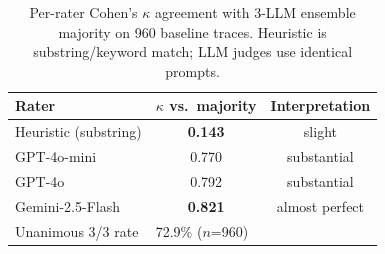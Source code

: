 \begin{table}[t]
\centering\small
\caption{Per-rater Cohen's $\kappa$ agreement with 3-LLM ensemble majority on 960 baseline traces. Heuristic is substring/keyword match; LLM judges use identical prompts.}
\label{tab:judge}
\begin{tabular}{lcc}
\toprule
Rater & $\kappa$ vs.\ majority & Interpretation \\
\midrule
Heuristic (substring) & \textbf{0.143} & slight \\
GPT-4o-mini & 0.770 & substantial \\
GPT-4o & 0.792 & substantial \\
Gemini-2.5-Flash & \textbf{0.821} & almost perfect \\
\midrule
Unanimous 3/3 rate & \multicolumn{2}{l}{72.9\% ($n$=960)} \\
\bottomrule
\end{tabular}
\end{table}